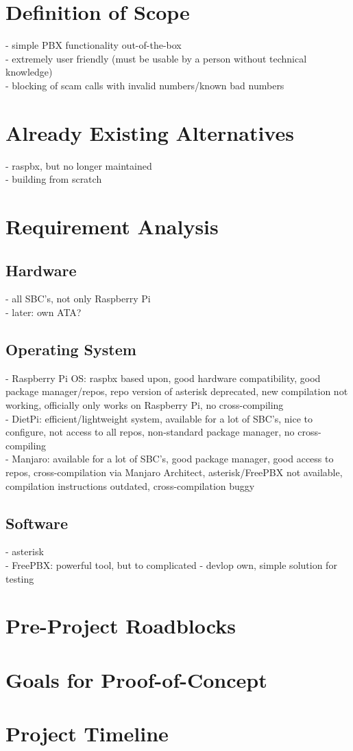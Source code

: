 \documentclass{docart-utility/docart}
\begin{document}
	\daGenerateTitlepage
	\tableofcontents
	
	\chapter{Definition of Scope}
		- simple PBX functionality out-of-the-box\\
		- extremely user friendly (must be usable by a person without technical knowledge)\\
		- blocking of scam calls with invalid numbers/known bad numbers
	
	\chapter{Already Existing Alternatives}
		- raspbx, but no longer maintained\\
		- building from scratch
	
	\chapter{Requirement Analysis}
		\section{Hardware}
			- all SBC's, not only Raspberry Pi\\
			- later: own ATA?
		
		\section{Operating System}
			- Raspberry Pi OS: raspbx based upon, good hardware compatibility, good package manager/repos, repo version of asterisk deprecated, new compilation not working, officially only works on Raspberry Pi, no cross-compiling\\
			-  DietPi: efficient/lightweight system, available for a lot of SBC's, nice to configure, not access to all repos, non-standard package manager, no cross-compiling\\
			- Manjaro: available for a lot of SBC's, good package manager, good access to repos, cross-compilation via Manjaro Architect, asterisk/FreePBX not available, compilation instructions outdated, cross-compilation buggy
		
		\section{Software}
			- asterisk\\
			- FreePBX: powerful tool, but to complicated
			- devlop own, simple solution for testing
		
	\chapter{Pre-Project Roadblocks}
		
	\chapter{Goals for Proof-of-Concept}
	
	\chapter{Project Timeline}
		
\end{document}
